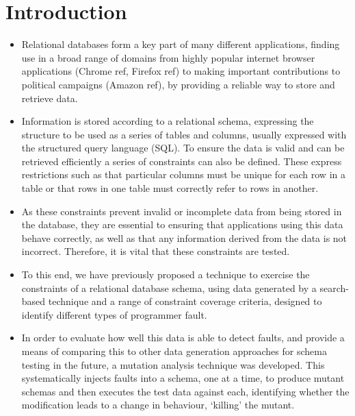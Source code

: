 
\section{Introduction}
\label{sec:introduction}

	\begin{itemize}

		\item Relational databases form a key part of many different applications, finding use in a broad range of domains from highly popular internet browser applications (Chrome ref, Firefox ref) to making important contributions to political campaigns (Amazon ref), by providing a reliable way to store and retrieve data.
		
		\item Information is stored according to a relational schema, expressing the structure to be used as a series of tables and columns, usually expressed with the structured query language (SQL). To ensure the data is valid and can be retrieved efficiently a series of constraints can also be defined. These express restrictions such as that particular columns must be unique for each row in a table or that rows in one table must correctly refer to rows in another.
		
		\item As these constraints prevent invalid or incomplete data from being stored in the database, they are essential to ensuring that applications using this data behave correctly, as well as that any information derived from the data is not incorrect. Therefore, it is vital that these constraints are tested.
		
		\item To this end, we have previously proposed a technique to exercise the constraints of a relational database schema, using data generated by a search-based technique and a range of constraint coverage criteria, designed to identify different types of programmer fault.

		\item In order to evaluate how well this data is able to detect faults, and provide a means of comparing this to other data generation approaches for schema testing in the future, a mutation analysis technique was developed. This systematically injects faults into a schema, one at a time, to produce mutant schemas and then executes the test data against each, identifying whether the modification leads to a change in behaviour, `killing' the mutant.


\end{itemize}
